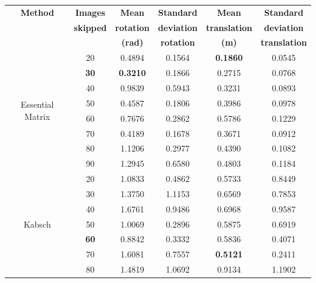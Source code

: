 \documentclass[12pt,a4paper]{article}
\begin{document}
    \begin{table}[p]
      \centering{}
      \hspace*{-1.5cm}\begin{tabular}{|c|c|c|c|c|c|}
      \hline
      \textbf{Method} & \textbf{Images}  & \textbf{Mean}       & \textbf{Standard}    & \textbf{Mean}         & \textbf{Standard} \\
      {}              & \textbf{skipped} & \textbf{rotation}   & \textbf{deviation}   & \textbf{translation}  & \textbf{deviation} \\
      {}              & {}               & \textbf{(rad)}      & \textbf{rotation}    & \textbf{(m)}          & \textbf{translation} \\
      \hline
      \multirow{8}{*}{Essential Matrix} & 20 & 0.4894 & 0.1564 &  \textbf{0.1860} & 0.0545 \\
                                        & \textbf{30} & \textbf{0.3210} & 0.1866 & 0.2715 & 0.0768 \\
                                        & 40 & 0.9839 & 0.5943 & 0.3231 & 0.0893 \\
                                        & 50 & 0.4587 & 0.1806 & 0.3986 & 0.0978 \\
                                        & 60 & 0.7676 & 0.2862 & 0.5786 & 0.1229 \\
                                        & 70 & 0.4189 & 0.1678 & 0.3671 & 0.0912 \\
                                        & 80 & 1.1206 & 0.2977 & 0.4390 & 0.1082 \\
                                        & 90 & 1.2945 & 0.6580 & 0.4803 & 0.1184 \\
      \hline
      \multirow{8}{*}{Kabsch} & 20 & 1.0833 & 0.4862 & 0.5733 & 0.8449 \\
                              & 30 & 1.3750 & 1.1153 & 0.6569 & 0.7853 \\
                              & 40 & 1.6761 & 0.9486 & 0.6968 & 0.9587 \\
                              & 50 & 1.0069 & 0.2896 & 0.5875 & 0.6919 \\
                              & \textbf{60} & 0.8842 & 0.3332 & 0.5836 & 0.4071 \\
                              & 70 & 1.6081 & 0.7557 & \textbf{0.5121} & 0.2411 \\
                              & 80 & 1.4819 & 1.0692 & 0.9134 & 1.1902 \\

\end{tabular}
\end{table}
\end{document}
